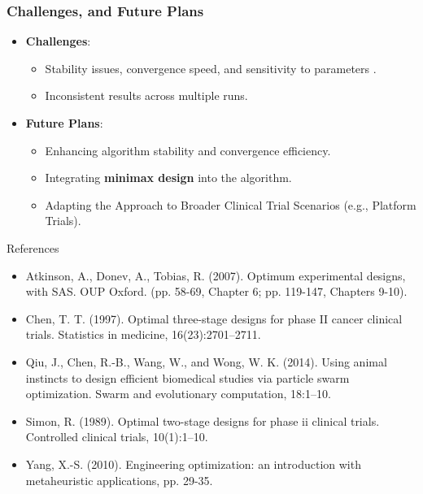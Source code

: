 \documentclass[xcolor=red]{beamer}
\begin{document}
\begin{frame}
\frametitle{Challenges, and Future Plans}
\begin{itemize}
    \item \textbf{Challenges}:
    \begin{itemize}
        \item Stability issues, convergence speed, and sensitivity to parameters .
        \item Inconsistent results across multiple runs.
    \end{itemize}
    
    \item \textbf{Future Plans}:
    \begin{itemize}
    	\item Enhancing algorithm stability and convergence efficiency.
        \item Integrating \textbf{minimax design} into the algorithm.
        \item Adapting the Approach to Broader Clinical Trial Scenarios (e.g., Platform Trials).
    \end{itemize}
\end{itemize}
\end{frame}


\begin{frame}{References}
\small %
\begin{itemize}
	\item Atkinson, A., Donev, A., Tobias, R. (2007). Optimum experimental designs, with SAS. OUP Oxford. (pp. 58-69, Chapter 6; pp. 119-147, Chapters 9-10).
	\item Chen, T. T. (1997). Optimal three-stage designs for phase II cancer clinical trials. Statistics in medicine, 16(23):2701–2711.
	\item Qiu, J., Chen, R.-B., Wang, W., and Wong, W. K. (2014). Using animal instincts to design efficient biomedical studies via particle swarm optimization. Swarm and evolutionary computation, 18:1–10.
    \item Simon, R. (1989). Optimal two-stage designs for phase ii clinical trials. Controlled clinical trials, 10(1):1–10.
    \item Yang, X.-S. (2010). Engineering optimization: an introduction with metaheuristic applications, pp. 29-35.
    
\end{itemize}
\end{frame}
\end{document}
